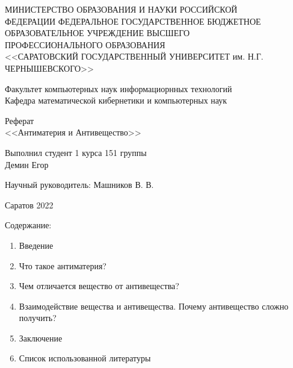 \thispagestyle{empty}
    \begin{center}
        МИНИСТЕРСТВО ОБРАЗОВАНИЯ И НАУКИ РОССИЙСКОЙ \\
        ФЕДЕРАЦИИ ФЕДЕРАЛЬНОЕ ГОСУДАРСТВЕННОЕ БЮДЖЕТНОЕ \\ 
        ОБРАЗОВАТЕЛЬНОЕ УЧРЕЖДЕНИЕ ВЫСШЕГО \\
        ПРОФЕССИОНАЛЬНОГО ОБРАЗОВАНИЯ \\
        <<САРАТОВСКИЙ ГОСУДАРСТВЕННЫЙ УНИВЕРСИТЕТ им. Н.Г.\\
        ЧЕРНЫШЕВСКОГО>>
      \vspace*{42pt}

       Факультет компьютерных наук информациорнных технологий \\
       Кафедра математической кибернетики и компьютерных наук
      \vspace*{112pt}

       Реферат\\
       <<Антиматерия и Антивещество>>
      \vspace*{112pt}      
  \end{center}

  \begin{flushright}
    Выполнил студент 1 курса 151 группы \\
    Демин Егор
    \vspace*{14pt}

    Научный руководитель: Машников В. В.\\
  \end{flushright}
  \vspace*{140pt}

  \centering
  Саратов 2022

  \newpage

  \begin{flushleft}
  Содержание:
  \begin{enumerate} 
    \item Введение
    \item Что такое антиматерия?
    \item Чем отличается вещество от антивещества?
    \item Взаимодействие вещества и антивещества. Почему антивещество сложно получить?
    \item Заключение
    \item Список использованной литературы
  \end{enumerate}
  \newpage
  \end{flushleft}
  